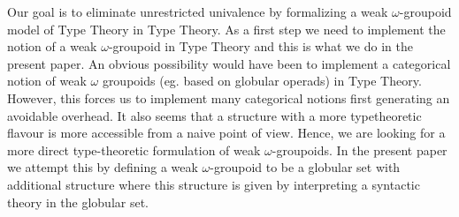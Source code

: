 Our goal is to eliminate unrestricted univalence by formalizing a weak
$\omega$-groupoid model of Type Theory in Type Theory.  As a first
step we need to implement the notion of a weak $\omega$-groupoid in
Type Theory and this is what we do in the present paper.  An obvious
possibility would have been to implement a categorical notion of weak
$\omega$ groupoids (eg. based on globular operads) in Type
Theory. However, this forces us to implement many categorical notions
first generating an avoidable overhead. It also seems that a structure
with a more typetheoretic flavour is more accessible from a naive
point of view. Hence, we are looking for a more direct
type-theoretic formulation of weak $\omega$-groupoids. In the present
paper we attempt this by defining a weak $\omega$-groupoid to be a
globular set with additional structure where this structure is given
by interpreting a syntactic theory in the globular set.




